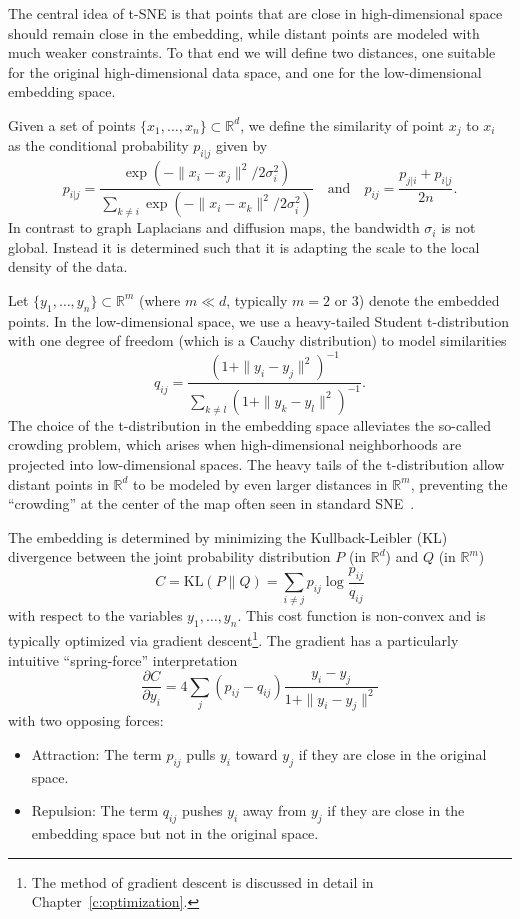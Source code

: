 The central idea of t-SNE is that points that are close in high-dimensional space should remain close in the embedding, while distant points are modeled with much weaker constraints. To that end we will define two distances, one suitable for the original high-dimensional data space, and one for the low-dimensional embedding space.

Given a set of points $\{x_1, \dots, x_n\} \subset \mathbb{R}^d$, we define the similarity of point $x_j$ to $x_i$ as the conditional probability $p_{i|j}$ given by
$$p_{i|j} = \frac{\exp(-\|x_i - x_j\|^2 / 2\sigma_i^2)}{\sum_{k \neq i} \exp(-\|x_i - x_k\|^2 / 2\sigma_i^2)} \quad \text{and} \quad
p_{ij} = \frac{p_{j|i} + p_{i|j}}{2n}.
$$
In contrast to graph Laplacians and diffusion maps,
the bandwidth $\sigma_i$ is not global. Instead it is determined such that it is adapting the scale to the local density of the data.

Let $\{y_1, \dots, y_n\} \subset \mathbb{R}^m$ (where $m \ll d$, typically $m=2$ or $3$) denote the embedded points. In the low-dimensional space, we use a heavy-tailed Student t-distribution with one degree of freedom (which is a Cauchy distribution) to model similarities
$$q_{ij} = \frac{(1 + \|y_i - y_j\|^2)^{-1}}{\sum_{k \neq l} (1 + \|y_k - y_l\|^2)^{-1}}.$$
The choice of the t-distribution in the embedding space alleviates the so-called crowding problem, which arises when high-dimensional neighborhoods are projected into low-dimensional spaces.
The heavy tails of the t-distribution allow distant points in $\mathbb{R}^d$ to be modeled by even larger distances in $\mathbb{R}^m$, preventing the ``crowding'' at the center of the map often seen in standard SNE~\cite{hinton2002stochastic}.

The embedding is determined by minimizing the Kullback-Leibler (KL) divergence between the joint probability distribution $P$ (in $\mathbb{R}^d$) and $Q$ (in $\mathbb{R}^m$)
\begin{equation}
    \label{KL-tsne}
C = \text{KL}(P \| Q) = \sum_{i \neq j} p_{ij} \log \frac{p_{ij}}{q_{ij}}
\end{equation}
with respect to the variables $y_1,\dots,y_n$.
This cost function is non-convex and is typically optimized via gradient descent\footnote{The method of gradient descent is discussed in detail in Chapter~\ref{c:optimization}.}. The gradient has a particularly intuitive ``spring-force'' interpretation
$$\frac{\partial C}{\partial y_i} = 4 \sum_j (p_{ij} - q_{ij})\frac{y_i - y_j}{1 + \|y_i - y_j\|^2}$$
with two opposing forces:
\begin{itemize}
\item[$\bullet$] 
Attraction: The term $p_{ij}$ pulls $y_i$ toward $y_j$ if they are close in the original space. 
\item[$\bullet$] 
Repulsion: The term $q_{ij}$ pushes $y_i$ away from $y_j$ if they are close in the embedding space but not in the original space.
\end{itemize}


